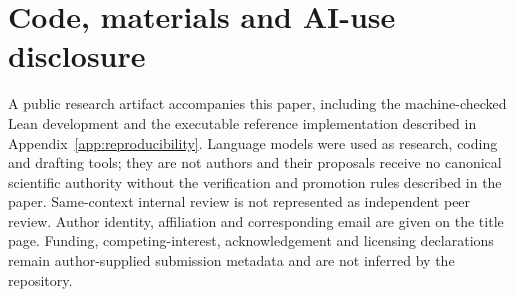 \documentclass[11pt]{article}
\begin{document}
\section*{Code, materials and AI-use disclosure}
A public research artifact accompanies this paper, including the machine-checked Lean development and the executable reference implementation described in Appendix~\ref{app:reproducibility}. Language models were used as research, coding and drafting tools; they are not authors and their proposals receive no canonical scientific authority without the verification and promotion rules described in the paper. Same-context internal review is not represented as independent peer review. Author identity, affiliation and corresponding email are given on the title page. Funding, competing-interest, acknowledgement and licensing declarations remain author-supplied submission metadata and are not inferred by the repository.


\end{document}
